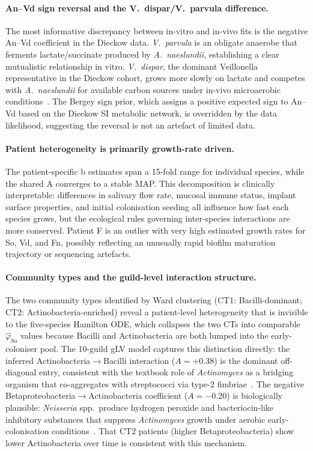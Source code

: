 \documentclass[11pt,a4paper]{article}
\begin{document}
\paragraph{An--Vd sign reversal and the V.~dispar/V.~parvula difference.}
The most informative discrepancy between in-vitro and in-vivo fits is the negative An--Vd coefficient in the Dieckow data.
\textit{V.~parvula} is an obligate anaerobe that ferments lactate/succinate produced by \textit{A.~naeslundii}, establishing a clear mutualistic relationship in vitro.
\textit{V.~dispar}, the dominant Veillonella representative in the Dieckow cohort, grows more slowly on lactate and competes with \textit{A.~naeslundii} for available carbon sources under in-vivo microaerobic conditions~\cite{Rogosa1965Veillonella}.
The Bergey sign prior, which assigns a positive expected sign to An--Vd based on the Dieckow SI metabolic network, is overridden by the data likelihood, suggesting the reversal is not an artefact of limited data.

\paragraph{Patient heterogeneity is primarily growth-rate driven.}
The patient-specific b estimates span a 15-fold range for individual species, while the shared A converges to a stable MAP.
This decomposition is clinically interpretable: differences in salivary flow rate, mucosal immune status, implant surface properties, and initial colonisation seeding all influence how fast each species grows, but the ecological rules governing inter-species interactions are more conserved.
Patient F is an outlier with very high estimated growth rates for So, Vd, and Fn, possibly reflecting an unusually rapid biofilm maturation trajectory or sequencing artefacts.

\paragraph{Community types and the guild-level interaction structure.}
The two community types identified by Ward clustering (CT1: Bacilli-dominant; CT2: Actinobacteria-enriched) reveal a patient-level heterogeneity that is invisible to the five-species Hamilton ODE, which collapses the two CTs into comparable $\hat{\varphi}_\mathrm{So}$ values because Bacilli and Actinobacteria are both lumped into the early-coloniser pool.
The 10-guild gLV model captures this distinction directly: the inferred Actinobacteria$\to$Bacilli interaction ($A=+0.38$) is the dominant off-diagonal entry, consistent with the textbook role of \textit{Actinomyces} as a bridging organism that co-aggregates with streptococci via type-2 fimbriae~\cite{Kolenbrander2010OralMultispecies}.
The negative Betaproteobacteria$\to$Actinobacteria coefficient ($A=-0.20$) is biologically plausible: \textit{Neisseria} spp.\ produce hydrogen peroxide and bacteriocin-like inhibitory substances that suppress \textit{Actinomyces} growth under aerobic early-colonisation conditions~\cite{Kolenbrander2010OralMultispecies}.
That CT2 patients (higher Betaproteobacteria) show lower Actinobacteria over time is consistent with this mechanism.
\end{document}

